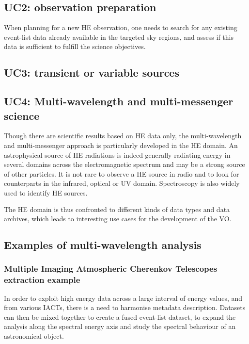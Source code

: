 \documentclass[11pt,a4paper]{ivoa}
\begin{document}
\subsection{UC2: observation preparation}

When planning for a new HE observation, one needs to search for any existing event-list data already available in the targeted sky regions, and assess if this data is sufficient to fulfill the science objectives.



\subsection{UC3: transient or variable sources}




\subsection{UC4: Multi-wavelength and multi-messenger science}

Though there are scientific results based on HE data only, the multi-wavelength and multi-messenger approach is particularly developed in the HE domain. An astrophysical source of HE radiations is indeed generally radiating energy in several domains across the electromagnetic spectrum and may be a strong source of other particles. It is not rare to observe a HE source in radio and to look for counterparts in the infrared, optical or UV domain. Spectroscopy is also widely used to identify HE sources.

The HE domain is thus confronted to different kinds of data types and data archives, which leads to interesting use cases for the development of the VO.



\subsection{Examples of multi-wavelength analysis}

\subsubsection{Multiple Imaging Atmospheric Cherenkov Telescopes extraction example}

In order to exploit high energy data across a large interval of energy values, and from various IACTs, there is a need to harmonise metadata description.
Datasets can then be mixed together to create a fused event-list dataset, to expand the analysis along the spectral energy axis and study the spectral behaviour of an astronomical object.
\end{document}
